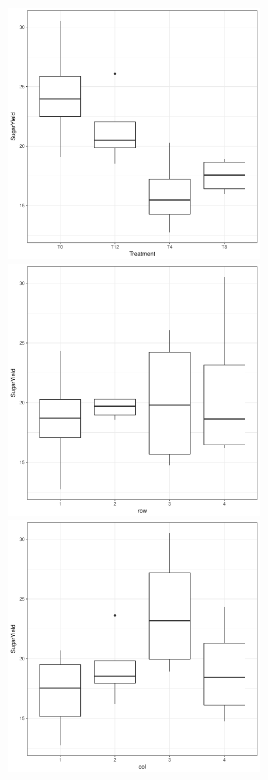 \documentclass[a4paper, 10pt, fleqn, twosided]{memoir}
\begin{document}
\begin{tcolorbox}[title = Exercise 6 output]
\includegraphics[width=0.5\textwidth, frame]{Exercise6trt_boxplot.pdf}
\includegraphics[width=0.5\textwidth, frame]{Exercise6row_boxplot.pdf}
\includegraphics[width=0.5\textwidth, frame]{Exercise6col_boxplot.pdf}
\end{tcolorbox}
\end{document}
